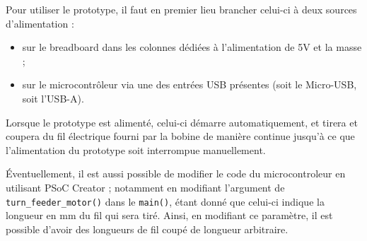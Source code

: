 Pour utiliser le prototype, il faut en premier lieu brancher celui-ci à deux sources d'alimentation :
\begin{itemize}
    \item sur le breadboard dans les colonnes dédiées à l'alimentation de 5V et la masse ;
    \item sur le microcontrôleur via une des entrées USB présentes (soit le Micro-USB, soit l'USB-A).
\end{itemize}

\par Lorsque le prototype est alimenté, celui-ci démarre automatiquement, et tirera et coupera du fil électrique fourni par la bobine de manière continue jusqu'à ce que l'alimentation du prototype soit interrompue manuellement.

\par Éventuellement, il est aussi possible de modifier le code du microcontroleur en utilisant PSoC Creator ; notamment en modifiant l'argument de \verb|turn_feeder_motor()| dans le \verb|main()|, étant donné que celui-ci indique la longueur en mm du fil qui sera tiré. Ainsi, en modifiant ce paramètre, il est possible d'avoir des longueurs de fil coupé de longueur arbitraire.
